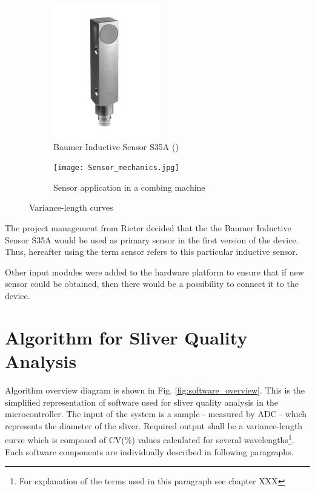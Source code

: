 \documentclass[twoside]{ctuthesis}
\theoremstyle{plain}
\theoremstyle{definition}
\theoremstyle{note}
\begin{document}
\begin{figure}
	\centering
	\begin{subfigure}{0.5\textwidth}
		\centering
		\includegraphics[width=0.75\linewidth]{baumer_inductiveSensor.JPG}
		\caption{Baumer Inductive Sensor S35A (\cite{cite:InductiveSensor})}
		\label{fig:sensor_only}
	\end{subfigure}%
	\begin{subfigure}{0.5\textwidth}
		\centering
		\texttt{[image: Sensor\_mechanics.jpg]}
		\caption{Sensor application in a combing machine}
		\label{fig:sens_Mechanical}
	\end{subfigure}
	\caption{Variance-length curves}
	\label{fig:sensor_double}
\end{figure}

The project management from Rieter decided that the the Baumer Inductive Sensor S35A would be used as primary sensor in the first version of the device. Thus, hereafter using the term sensor refers to this particular inductive sensor.

Other input modules were added to the hardware platform to ensure that if new sensor could be obtained, then there would be a possibility to connect it to the device.

\section{Algorithm for Sliver Quality Analysis}
\label{algorithmForSliver}
Algorithm overview diagram is shown in Fig. \ref{fig:software_overview}. This is the simplified representation of software used for sliver quality analysis in the microcontroller. The input of the system is a sample - measured by ADC - which represents the diameter of the sliver. Required output shall be a variance-length curve which is composed of CV(\%) values calculated for several wavelengths\footnote{\label{footnote1:textileTerms}For explanation of the terms used in this paragraph see chapter XXX}. Each software components are individually described in following paragraphs.
\end{document}

